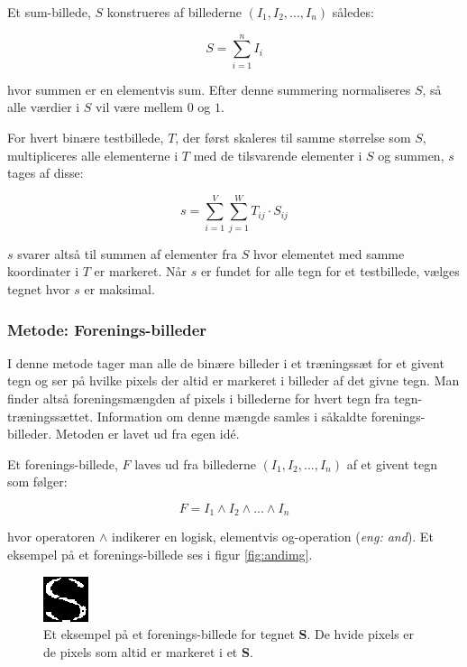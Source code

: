 Et sum-billede, $S$ konstrueres af billederne $(I_{1},I_{2},...,I_{n})$ således:

\begin{displaymath}
	S = \sum_{i=1}^n{I_i}
\end{displaymath}

hvor summen er en elementvis sum. Efter denne summering normaliseres $S$, så alle værdier i $S$ vil være mellem $0$ og $1$.

For hvert binære testbillede, $T$, der først skaleres til samme størrelse som $S$, multipliceres alle elementerne i $T$ med de tilsvarende elementer i $S$ og summen, $s$ tages af disse:

\begin{displaymath}
	s = \sum_{i=1}^V{\sum_{j=1}^W{T_{ij} \cdot S_{ij}}}
\end{displaymath}

$s$ svarer altså til summen af elementer fra $S$ hvor elementet med samme koordinater i $T$ er markeret. Når $s$ er fundet for alle tegn for et testbillede, vælges tegnet hvor $s$ er maksimal.

\subsubsection*{Metode: Forenings-billeder}

I denne metode tager man alle de binære billeder i et træningssæt for et givent tegn og ser på hvilke pixels der altid er markeret i billeder af det givne tegn. Man finder altså foreningsmængden af pixels i billederne for hvert tegn fra tegn-træningssættet. Information om denne mængde samles i såkaldte forenings-billeder. Metoden er lavet ud fra egen idé.

Et forenings-billede, $F$ laves ud fra billederne $(I_{1},I_{2},...,I_{n})$ af et givent tegn som følger:

\begin{displaymath}
F = I_1 \wedge I_2 \wedge ... \wedge I_n
\end{displaymath}

hvor operatoren $\wedge$ indikerer en logisk, elementvis og-operation (\textit{eng: and}). Et eksempel på et forenings-billede ses i figur \vref{fig:andimg}.

\begin{figure}[htp]
\centering
\includegraphics{system/illu/andimg.png} 
\caption{Et eksempel på et forenings-billede for tegnet \textbf{S}. De hvide pixels er de pixels som altid er markeret i et \textbf{S}.}
\label{fig:andimg}
\end{figure}

